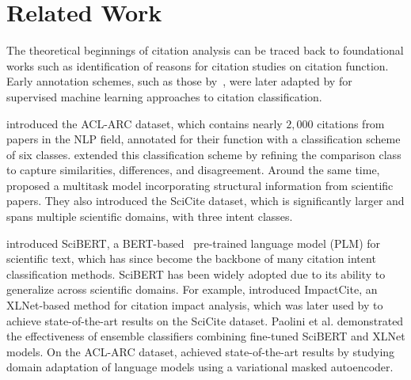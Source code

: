 \section{Related Work}\label{sec:related_work}








The theoretical beginnings of citation analysis can be traced back to foundational works such as  identification of reasons for citation  studies on citation function. Early annotation schemes, such as those by~\citet{Spi1977}, were later adapted by \citet{TST2006a} for supervised machine learning approaches to citation classification.

\citet{JKH2018} introduced the ACL-ARC dataset, which contains nearly $2,000$ citations from papers in the NLP field, annotated for their function with a classification scheme of six classes. \citet{PK2020} extended this classification scheme by refining the comparison class to capture similarities, differences, and disagreement. Around the same time, \citet{CAZ2019} proposed a multitask model incorporating structural information from scientific papers. They also introduced the SciCite dataset, which is significantly larger and spans multiple scientific domains, with three intent classes. 

\citet{BLC2019} introduced SciBERT, a BERT-based~\citep{delvin-bert} pre-trained language model (PLM) for scientific text, which has since become the backbone of many citation intent classification methods. SciBERT has been widely adopted due to its ability to generalize across scientific domains. For example, \citet{MRR2021} introduced ImpactCite, an XLNet-based method for citation impact analysis, which was later used by \citet{PVD2024} to achieve state-of-the-art results on the SciCite dataset. Paolini et al. demonstrated the effectiveness of ensemble classifiers combining fine-tuned SciBERT and XLNet models. On the ACL-ARC dataset, \citet{HHD2022} achieved state-of-the-art results by studying domain adaptation of language models using a variational masked autoencoder.


